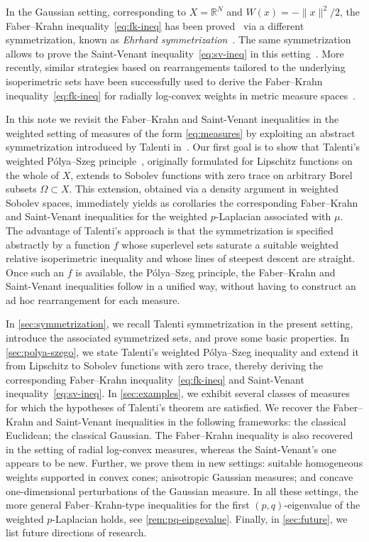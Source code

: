 \documentclass[a4paper,12pt,reqno]{amsart}
\numberwithin{equation}{section}
\renewcommand{\H}{\mathcal{H}}
\theoremstyle{plain}
\theoremstyle{definition}
\begin{document}
In the Gaussian setting, corresponding to $X=\mathbb{R}^N$ and $W(x)=-\|x\|^2/2$, the Faber--Krahn inequality~\eqref{eq:fk-ineq} has been proved~\cite{Ehr84} via a different symmetrization, known as \emph{Ehrhard symmetrization}~\cite{Ehr83}. The same symmetrization allows to prove the Saint-Venant inequality~\eqref{eq:sv-ineq} in this setting~\cite[Sect.~5]{Liv24}.
More recently, similar strategies based on rearrangements tailored to the underlying isoperimetric sets have been successfully used to derive the Faber--Krahn inequality~\eqref{eq:fk-ineq} for radially log-convex weights in metric measure spaces~\cite{CM25,NV25}.

In this note we revisit the Faber--Krahn and Saint-Venant inequalities in the weighted setting of measures of the form \eqref{eq:measures} by exploiting an abstract symmetrization introduced by Talenti in~\cite{Tal97}. 
Our first goal is to show that Talenti's weighted P\'olya--Szeg\H{o} principle~\cite[Main Thm.]{Tal97}, originally formulated for Lipschitz functions on the whole of $X$, extends to Sobolev functions with zero trace on arbitrary Borel subsets $\Omega\subset X$. 
This extension, obtained via a density argument in weighted Sobolev spaces, immediately yields as corollaries the corresponding Faber--Krahn and Saint-Venant inequalities for the weighted $p$-Laplacian associated with $\mu$. 
The advantage of Talenti's approach is that the symmetrization is specified abstractly by a function $f$ whose superlevel sets saturate a suitable weighted relative isoperimetric inequality and whose lines of steepest descent are straight. 
Once such an $f$ is available, the P\'olya--Szeg\H{o} principle, the Faber--Krahn and Saint-Venant inequalities follow in a unified way, without having to construct an ad hoc rearrangement for each measure.

In \cref{sec:symmetrization}, we recall Talenti symmetrization in the present setting, introduce the associated symmetrized sets, and prove some basic properties. 
In \cref{sec:polya-szego}, we state Talenti's weighted P\'olya--Szeg\H{o} inequality and extend it from Lipschitz to Sobolev functions with zero trace, thereby deriving the corresponding Faber--Krahn inequality~\eqref{eq:fk-ineq} and Saint-Venant inequality~\eqref{eq:sv-ineq}. 
In \cref{sec:examples}, we exhibit several classes of measures for which the hypotheses of Talenti's theorem are satisfied. We recover the Faber--Krahn and Saint-Venant inequalities in the following frameworks: the classical Euclidean; the classical Gaussian. The Faber--Krahn inequality is also recovered in the setting of radial log-convex measures, whereas the Saint-Venant's one appears to be new. Further, we prove them in new settings: suitable homogeneous weights supported in convex cones; anisotropic Gaussian measures; and concave one-dimensional perturbations of the Gaussian measure. In all these settings, the more general Faber--Krahn-type inequalities for the first $(p,q)$-eigenvalue of the weighted $p$-Laplacian holds, see \cref{rem:pq-eingevalue}.
Finally, in \cref{sec:future}, we list future directions of research.
\end{document}
